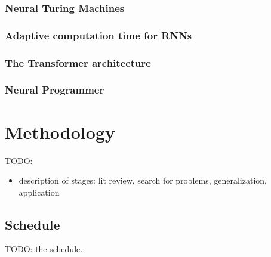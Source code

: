 \documentclass[English]{style/ic-tese-v3}
\begin{document}
\subsection{Neural Turing Machines}

\subsection{Adaptive computation time for RNNs}

\subsection{The Transformer architecture}

\subsection{Neural Programmer}

\let\clearpage\relax

\chapter{Methodology}
TODO:
\begin{itemize}
    \item description of stages: lit review,
        search for problems, generalization, application
\end{itemize}

\section{Schedule}
TODO: the schedule.

\renewcommand\bibname{References\vspace*{10mm}}

\begingroup
\let\clearpage\relax


\endgroup
\end{document}
